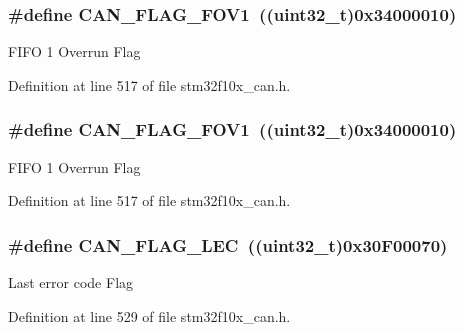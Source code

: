 \subsubsection[{\texorpdfstring{C\+A\+N\+\_\+\+F\+L\+A\+G\+\_\+\+F\+O\+V1}{CAN_FLAG_FOV1}}]{\setlength{\rightskip}{0pt plus 5cm}\#define C\+A\+N\+\_\+\+F\+L\+A\+G\+\_\+\+F\+O\+V1~(({\bf uint32\+\_\+t})0x34000010)}\hypertarget{group___c_a_n__flags_gac1af6e61b1285ddc4658c4bcc152719a}{}\label{group___c_a_n__flags_gac1af6e61b1285ddc4658c4bcc152719a}
F\+I\+FO 1 Overrun Flag 

Definition at line 517 of file stm32f10x\+\_\+can.\+h.

\subsubsection[{\texorpdfstring{C\+A\+N\+\_\+\+F\+L\+A\+G\+\_\+\+F\+O\+V1}{CAN_FLAG_FOV1}}]{\setlength{\rightskip}{0pt plus 5cm}\#define C\+A\+N\+\_\+\+F\+L\+A\+G\+\_\+\+F\+O\+V1~(({\bf uint32\+\_\+t})0x34000010)}\hypertarget{group___c_a_n__flags_gac1af6e61b1285ddc4658c4bcc152719a}{}\label{group___c_a_n__flags_gac1af6e61b1285ddc4658c4bcc152719a}
F\+I\+FO 1 Overrun Flag 

Definition at line 517 of file stm32f10x\+\_\+can.\+h.

\subsubsection[{\texorpdfstring{C\+A\+N\+\_\+\+F\+L\+A\+G\+\_\+\+L\+EC}{CAN_FLAG_LEC}}]{\setlength{\rightskip}{0pt plus 5cm}\#define C\+A\+N\+\_\+\+F\+L\+A\+G\+\_\+\+L\+EC~(({\bf uint32\+\_\+t})0x30\+F00070)}\hypertarget{group___c_a_n__flags_ga73a774fa4d391aec0ea6552bf9372917}{}\label{group___c_a_n__flags_ga73a774fa4d391aec0ea6552bf9372917}
Last error code Flag 

Definition at line 529 of file stm32f10x\+\_\+can.\+h.

